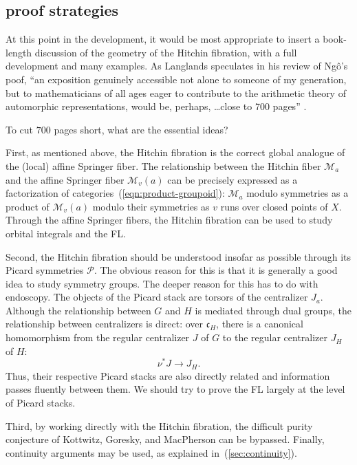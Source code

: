 \documentclass[brochure,english,12pt]{bourbaki}
\theoremstyle{plain}
\def\cc{\mathfrak{c}}
\def\M{{\mathcal M}}
\def\P{{\mathcal P}}
\begin{document}
\subsection{proof strategies}

At this point in the development, it would be most appropriate to
insert a book-length discussion of the geometry of the Hitchin
fibration, with a full development and many examples.  As Langlands
speculates in his review of Ng\^o's poof, ``an exposition genuinely
accessible not alone to someone of my generation, but to
mathematicians of all ages eager to contribute to the arithmetic
theory of automorphic representations, would be, perhaps, \ldots close
to 700 pages'' \cite{L:Ngo}.

To cut  $700$ pages short, what are the essential ideas?  

First, as mentioned above, the Hitchin fibration is the correct global
analogue of the (local) affine Springer fiber.  The relationship
between the Hitchin fiber $\M_a$ and the affine Springer fiber
$\M_v(a)$ can be precisely expressed as a factorization of
categories~(\ref{eqn:product-groupoid}): $\M_a$ modulo symmetries as a
product of $\M_v(a)$ modulo their symmetries as $v$ runs over closed
points of $X$.  Through the affine Springer fibers, the Hitchin
fibration can be used to study orbital integrals and the FL.

Second, the Hitchin fibration should be understood insofar as possible
through its Picard symmetries $\P$.  The obvious reason for this is
that it is generally a good idea to study symmetry groups.  The deeper
reason for this has to do with endoscopy.  The objects of the Picard
stack are torsors of the centralizer $J_a$.  Although the relationship
between $G$ and $H$ is mediated through dual groups, the relationship
between centralizers is direct: over $\cc_H$, there is a canonical
homomorphism from the regular centralizer $J$ of $G$ to the regular
centralizer $J_H$ of $H$:
\begin{equation}\label{eqn:JH}
\nu^*J\to J_H.
\end{equation}
Thus, their respective Picard stacks  are also
directly related and information passes fluently between them.  We should try to prove the FL
 largely at the level of Picard stacks.

 Third, by working directly with the Hitchin fibration, the difficult
 purity conjecture of Kottwitz, Goresky, and MacPherson can be
 bypassed.  Finally, continuity arguments may be used, as explained in~(\ref{sec:continuity}).
\end{document}
